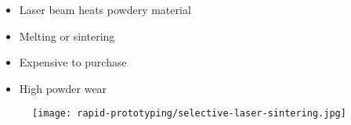 \begin{frame}
    \begin{itemize}
        \item Laser beam heats powdery material
        \item Melting or sintering
        \item Expensive to purchase
        \item High powder wear
    \end{itemize}
    \begin{figure}
        \texttt{[image: rapid-prototyping/selective-laser-sintering.jpg]}
        \caption{}
    \end{figure}
\end{frame}